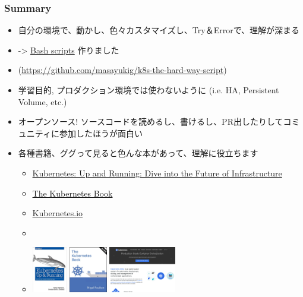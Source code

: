 \documentclass[aspectratio=169,11pt,hyperref={colorlinks=true}]{beamer}
\begin{document}
\begin{frame}
  \frametitle{Summary}
  \begin{itemize}
    \item 自分の環境で、動かし、色々カスタマイズし、Try＆Errorで、理解が深まる
    \item[] -> \href{https://github.com/masayukig/k8s-the-hard-way-script}{Bash scripts} 作りました
    \item[] (\url{https://github.com/masayukig/k8s-the-hard-way-script})
    \item 学習目的, プロダクション環境では使わないように (i.e. HA, Persistent Volume, etc.)
    \item オープンソース! ソースコードを読めるし、書けるし、PR出したりしてコミュニティに参加したほうが面白い
    \item 各種書籍、ググって見ると色んな本があって、理解に役立ちます
    \begin{itemize}
      \item \href{https://www.amazon.com/dp/B075G373MJ/}{Kubernetes: Up and Running: Dive into the Future of Infrastructure}
      \item
      \href{https://www.amazon.com/dp/B072TS9ZQZ/}{The Kubernetes Book}
      \item
      \href{https://kubernetes.io}{Kubernetes.io}
      \item[]
      \item[] \includegraphics[height=20mm]{images/kubernetes-up-and-running.png}
       \includegraphics[height=20mm]{images/the-kubernetes-book.png}
       \includegraphics[height=20mm]{images/kubernetes-io.png}
    \end{itemize}
  \end{itemize}
\end{frame}
\end{document}
